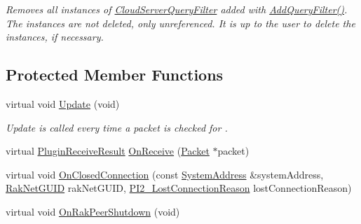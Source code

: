 \begin{DoxyCompactItemize}
\begin{DoxyCompactList}\small\item\em Removes all instances of \hyperlink{class_rak_net_1_1_cloud_server_query_filter}{Cloud\-Server\-Query\-Filter} added with \hyperlink{class_rak_net_1_1_cloud_server_a992b7c2f60266c4743b7d872068837a8}{Add\-Query\-Filter()}. The instances are not deleted, only unreferenced. It is up to the user to delete the instances, if necessary. \end{DoxyCompactList}\end{DoxyCompactItemize}
\subsection*{Protected Member Functions}
\begin{DoxyCompactItemize}
\item 
\hypertarget{class_rak_net_1_1_cloud_server_a2c1183222ca75449dd2306a73b80596b}{virtual void \hyperlink{class_rak_net_1_1_cloud_server_a2c1183222ca75449dd2306a73b80596b}{Update} (void)}\label{class_rak_net_1_1_cloud_server_a2c1183222ca75449dd2306a73b80596b}

\begin{DoxyCompactList}\small\item\em Update is called every time a packet is checked for . \end{DoxyCompactList}\item 
virtual \hyperlink{group___p_l_u_g_i_n___i_n_t_e_r_f_a_c_e___g_r_o_u_p_ga89998adaafb29e5d879113b992161085}{Plugin\-Receive\-Result} \hyperlink{class_rak_net_1_1_cloud_server_adbee1916d2deb68367f642065f029055}{On\-Receive} (\hyperlink{struct_rak_net_1_1_packet}{Packet} $\ast$packet)
\item 
virtual void \hyperlink{class_rak_net_1_1_cloud_server_a9d94fce61a37b8f4b0db1ab01d816c3e}{On\-Closed\-Connection} (const \hyperlink{struct_rak_net_1_1_system_address}{System\-Address} \&system\-Address, \hyperlink{struct_rak_net_1_1_rak_net_g_u_i_d}{Rak\-Net\-G\-U\-I\-D} rak\-Net\-G\-U\-I\-D, \hyperlink{group___p_l_u_g_i_n___i_n_t_e_r_f_a_c_e___g_r_o_u_p_ga376cc546fd6892c2ead48cd51796c8b8}{P\-I2\-\_\-\-Lost\-Connection\-Reason} lost\-Connection\-Reason)
\item 
\hypertarget{class_rak_net_1_1_cloud_server_a16b695d44ab52acfc3c24e7675b175c5}{virtual void \hyperlink{class_rak_net_1_1_cloud_server_a16b695d44ab52acfc3c24e7675b175c5}{On\-Rak\-Peer\-Shutdown} (void)}\label{class_rak_net_1_1_cloud_server_a16b695d44ab52acfc3c24e7675b175c5}


\end{DoxyCompactItemize}
